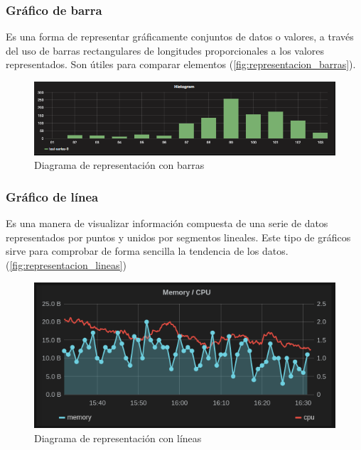 \subsubsection*{Gráfico de barra}
Es una forma de representar gráficamente conjuntos de datos o valores, a través del uso de barras rectangulares de longitudes proporcionales a los valores representados. Son útiles para comparar elementos (\autoref{fig:representacion_barras}).

\begin{figure}
  \includegraphics[width=\linewidth]{src/images/01-capitulo-1/representacion_barras.png}
  \caption{Diagrama de representación con barras}
  \label{fig:representacion_barras}
\end{figure}

\subsubsection*{Gráfico de línea}
Es una manera de visualizar información compuesta de una serie de datos representados por puntos y unidos por segmentos lineales. Este tipo de gráficos sirve para comprobar de forma sencilla la tendencia de los datos.(\autoref{fig:representacion_lineas})

\begin{figure}
  \includegraphics[width=\linewidth]{src/images/01-capitulo-1/representacion_lineas.png}
  \caption{Diagrama de representación con líneas}
  \label{fig:representacion_lineas}
\end{figure}

